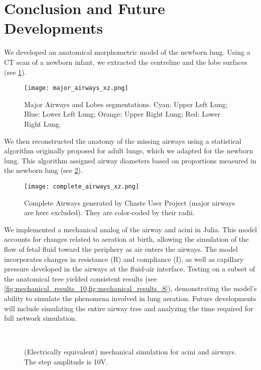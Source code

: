 \section{Conclusion and Future Developments}
\label{sec:model_development}

We developed an anatomical morphometric model of the newborn
lung. Using a CT scan of a newborn infant, we extracted the centreline
and the lobe surfaces (see \cref{fig:major_airways_xz}).

\begin{figure}[]\centering
  \texttt{[image: major\_airways\_xz.png]}
  \caption{Major Airways and Lobes segmentations.  Cyan: Upper Left
    Lung; Blue: Lower Left Lung; Orange: Upper Right Lung; Red: Lower
    Right Lung.}
  \label{fig:major_airways_xz}
\end{figure}

We then reconstructed the anatomy of the missing airways using a
statistical algorithm originally proposed for adult lungs, which we
adapted for the newborn lung. This algorithm assigned airway diameters
based on proportions measured in the newborn lung (see
\cref{fig:complete_airways_xz}).

\begin{figure}[]\centering
  \texttt{[image: complete\_airways\_xz.png]}
  \caption{Complete Airways generated by Chaste User Project (major
    airways are here excluded).  They are color-coded by their radii.}
  \label{fig:complete_airways_xz}
\end{figure}

We implemented a mechanical analog of the airway and acini in
Julia. This model accounts for changes related to aeration at birth,
allowing the simulation of the flow of fetal fluid toward the
periphery as air enters the airways.  The model incorporates changes
in resistance (R) and compliance (I), as well as capillary pressure
developed in the airways at the fluid-air interface. Testing on a
subset of the anatomical tree yielded consistent results (see
\cref{fig:mechanical_results_10,fig:mechanical_results_8}),
demonstrating the model's ability to simulate the phenomena involved
in lung aeration. Future developments will include simulating the
entire airway tree and analyzing the time required for full network
simulation.

\begin{figure}[]\centering
  \\
  \caption{(Electrically equivalent) mechanical simulation for acini
    and airways.  The step amplitude is 10V.}
  \label{fig:mechanical_results_10}
\end{figure}


